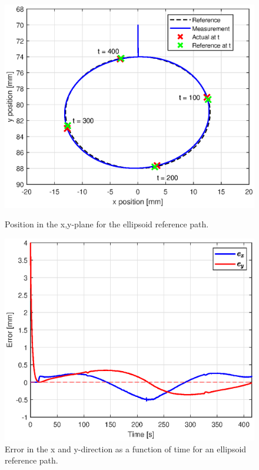 \begin{figure}[H] 
    \begin{minipage}[b]{0.49\linewidth}
     \centering
    \includegraphics[width=\linewidth]{Figures/Chapter5/errorXYplaneTell400.eps} 
    \caption{Position in the x,y-plane for the ellipsoid reference path. } 
    \label{fig5:xysim} 
       \end{minipage} 
    \begin{minipage}[b]{0.49\linewidth}
     \centering
    \includegraphics[width=\linewidth]{Figures/Chapter5/errorxyTell400.eps} 
    \caption{Error in the x and y-direction as a function of time for an ellipsoid reference path.} 
    \label{fig5:errorxyellipssim} 
    \end{minipage} 
\end{figure}


